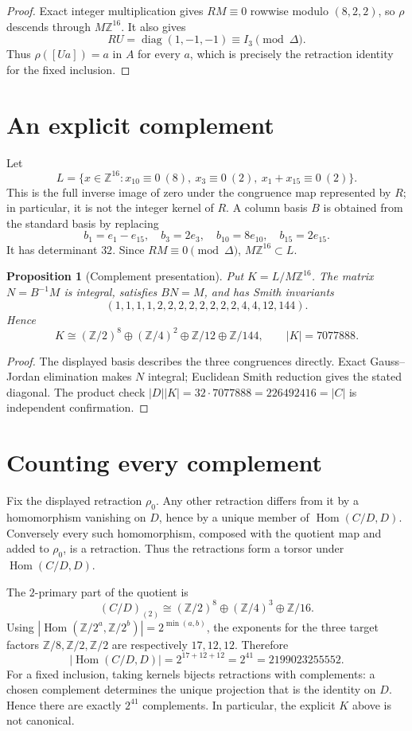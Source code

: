 \documentclass[10pt]{article}
\newtheorem{proposition}{Proposition}
\newcommand{\Z}{\mathbb Z}
\newcommand{\Hom}{\operatorname{Hom}}
\newcommand{\diag}{\operatorname{diag}}
\begin{document}
\begin{proof}
Exact integer multiplication gives $RM\equiv0$ rowwise modulo $(8,2,2)$,
so $\rho$ descends through $M\Z^{16}$.  It also gives
\[
 RU=\diag(1,-1,-1)\equiv I_3\pmod\Delta.
\]
Thus $\rho([Ua])=a$ in $A$ for every $a$, which is precisely the retraction
identity for the fixed inclusion.
\end{proof}

\section{An explicit complement}
Let
\[
 L=\{x\in\Z^{16}:x_{10}\equiv0\ (8),\ x_3\equiv0\ (2),\
 x_1+x_{15}\equiv0\ (2)\}.
\]
This is the full inverse image of zero under the congruence map represented by
$R$; in particular, it is not the integer kernel of $R$.  A column basis $B$
is obtained from the standard basis by replacing
\[
 b_1=e_1-e_{15},\quad b_3=2e_3,\quad
 b_{10}=8e_{10},\quad b_{15}=2e_{15}.
\]
It has determinant $32$.  Since $RM\equiv0\pmod\Delta$,
$M\Z^{16}\subset L$.

\begin{proposition}[Complement presentation]
Put $K=L/M\Z^{16}$.  The matrix $N=B^{-1}M$ is integral, satisfies $BN=M$,
and has Smith invariants
\[
 (1,1,1,1,2,2,2,2,2,2,2,2,4,4,12,144).
\]
Hence
\[
 K\cong(\Z/2)^8\oplus(\Z/4)^2\oplus\Z/12\oplus\Z/144,
 \qquad |K|=7077888.
\]
\end{proposition}

\begin{proof}
The displayed basis describes the three congruences directly.  Exact
Gauss--Jordan elimination makes $N$ integral; Euclidean Smith reduction gives
the stated diagonal.  The product check
$|D||K|=32\cdot7077888=226492416=|C|$ is independent confirmation.
\end{proof}

\section{Counting every complement}
Fix the displayed retraction $\rho_0$.  Any other retraction differs from it
by a homomorphism vanishing on $D$, hence by a unique member of
$\Hom(C/D,D)$.  Conversely every such homomorphism, composed with the quotient
map and added to $\rho_0$, is a retraction.  Thus the retractions form a
torsor under $\Hom(C/D,D)$.

The $2$-primary part of the quotient is
\[
 (C/D)_{(2)}\cong(\Z/2)^8\oplus(\Z/4)^3\oplus\Z/16.
\]
Using $|\Hom(\Z/2^a,\Z/2^b)|=2^{\min(a,b)}$, the exponents for the three
target factors $\Z/8,\Z/2,\Z/2$ are respectively $17,12,12$.  Therefore
\[
 |\Hom(C/D,D)|=2^{17+12+12}=2^{41}=2199023255552.
\]
For a fixed inclusion, taking kernels bijects retractions with complements:
a chosen complement determines the unique projection that is the identity on
$D$.  Hence there are exactly $2^{41}$ complements.  In particular, the
explicit $K$ above is not canonical.
\end{document}
